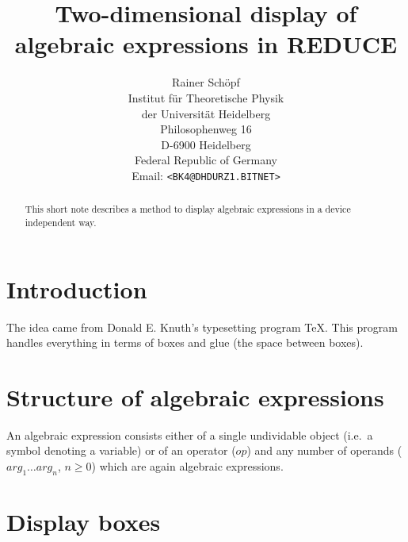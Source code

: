 
\newcommand{\REDUCE}{{\sf REDUCE}}
\newcommand{\MACSYMA}{{\sf MACSYMA}}
\newcommand{\MAPLE}{{\sf MAPLE}}
\newcommand{\Mathematica}{{\sf Mathematica}}
\newcommand{\PSL}{{\sf PSL}}
\renewcommand{\today}{Apr 27, 1990}



\title{Two-dimensional display of algebraic expressions
       in \REDUCE}

\author{Rainer Sch\"opf\\
        Institut f\"ur Theoretische Physik\\
        der Universit\"at Heidelberg\\
        Philosophenweg 16\\
        D-6900 Heidelberg\\
        Federal Republic of Germany\\
        Email: \verb|<BK4@DHDURZ1.BITNET>|}

\maketitle

\begin{abstract}
  This short note describes a method to display algebraic expressions
  in a device independent way.
\end{abstract}

\section{Introduction}

The idea came from Donald E. Knuth's typesetting program \TeX.
This program handles everything in terms of boxes and glue (the space
between boxes).

\section{Structure of algebraic expressions}

An algebraic expression consists either of a single undividable
object (i.e.\ a symbol denoting a variable) or of an operator ($op$)
and any number of operands ($arg_{1}\ldots arg_{n}$, $n\geq 0$) which
are again algebraic expressions.

\section{Display boxes}

